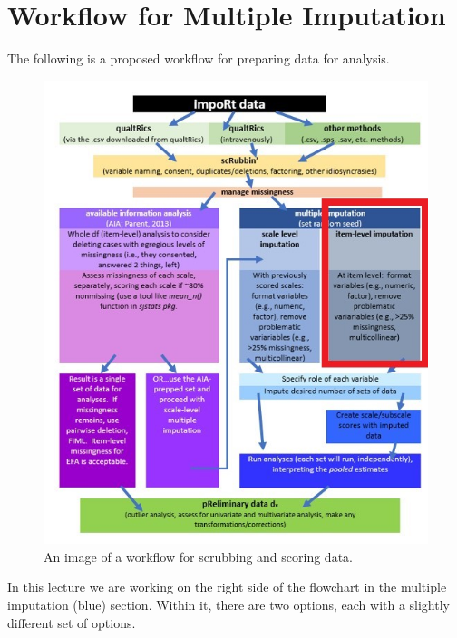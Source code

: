 \documentclass[
  english,
]{book}
\begin{document}
\hypertarget{workflow-for-multiple-imputation}{%
\section{Workflow for Multiple Imputation}\label{workflow-for-multiple-imputation}}

The following is a proposed workflow for preparing data for analysis.

\begin{figure}
\centering
\includegraphics{images/Ch05/scrubscore_mimp_itemlvl.jpg}
\caption{An image of a workflow for scrubbing and scoring data.}
\end{figure}

In this lecture we are working on the right side of the flowchart in the multiple imputation (blue) section. Within it, there are two options, each with a slightly different set of options.
\end{document}
